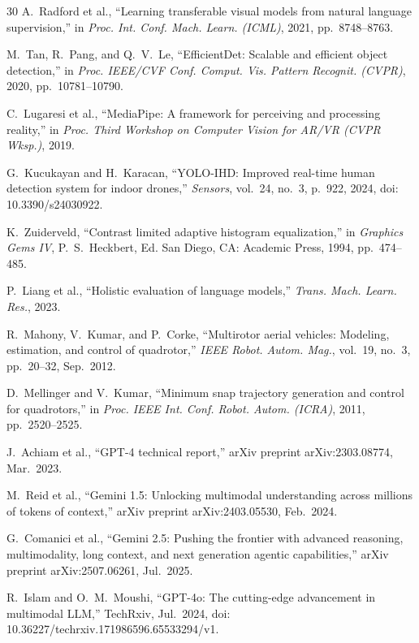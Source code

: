 \documentclass[journal]{IEEEtran}
\begin{document}
\begin{thebibliography}{30}
A.~Radford et al.,
``Learning transferable visual models from natural language supervision,''
in \emph{Proc. Int. Conf. Mach. Learn. (ICML)}, 2021, pp.~8748--8763.

M.~Tan, R.~Pang, and Q.~V.~Le,
``EfficientDet: Scalable and efficient object detection,''
in \emph{Proc. IEEE/CVF Conf. Comput. Vis. Pattern Recognit. (CVPR)},
2020, pp.~10781--10790.

C.~Lugaresi et al.,
``MediaPipe: A framework for perceiving and processing reality,''
in \emph{Proc. Third Workshop on Computer Vision for AR/VR (CVPR Wksp.)},
2019.

G.~Kucukayan and H.~Karacan,
``YOLO-IHD: Improved real-time human detection system for indoor drones,''
\emph{Sensors}, vol.~24, no.~3, p.~922, 2024,
doi: 10.3390/s24030922.

K.~Zuiderveld,
``Contrast limited adaptive histogram equalization,''
in \emph{Graphics Gems IV}, P.~S.~Heckbert, Ed.
San Diego, CA: Academic Press, 1994, pp.~474--485.

P.~Liang et al.,
``Holistic evaluation of language models,''
\emph{Trans. Mach. Learn. Res.}, 2023.

R.~Mahony, V.~Kumar, and P.~Corke,
``Multirotor aerial vehicles: Modeling, estimation, and control of quadrotor,''
\emph{IEEE Robot. Autom. Mag.}, vol.~19, no.~3, pp.~20--32, Sep.~2012.

D.~Mellinger and V.~Kumar,
``Minimum snap trajectory generation and control for quadrotors,''
in \emph{Proc. IEEE Int. Conf. Robot. Autom. (ICRA)}, 2011,
pp.~2520--2525.

J.~Achiam et al.,
``GPT-4 technical report,''
arXiv preprint arXiv:2303.08774, Mar.~2023.

M.~Reid et al.,
``Gemini 1.5: Unlocking multimodal understanding across millions of tokens of context,''
arXiv preprint arXiv:2403.05530, Feb.~2024.

G.~Comanici et al.,
``Gemini 2.5: Pushing the frontier with advanced reasoning, multimodality,
long context, and next generation agentic capabilities,''
arXiv preprint arXiv:2507.06261, Jul.~2025.

R.~Islam and O.~M.~Moushi,
``GPT-4o: The cutting-edge advancement in multimodal LLM,''
TechRxiv, Jul.~2024, doi: 10.36227/techrxiv.171986596.65533294/v1.

\end{thebibliography}
\end{document}
